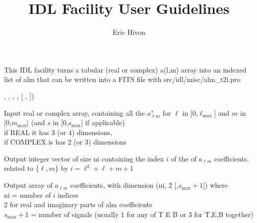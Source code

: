

\sloppy

\title{\healpix IDL Facility User Guidelines}
 \section[alm\_t2i]{ }
\label{idl:alm_t2i}
\author{Eric Hivon}

\begin{facility}
{This IDL facility turns a tabular (real or complex) a(l,m) array into an
indexed list of alm that can be written into a FITS file with %
}
{src/idl/misc/alm\_t2i.pro}
\end{facility}

\begin{IDLformat}
{\thedocid, %
,
, 
,
[%
,
%
])}
\end{IDLformat}

\begin{qualifiers}
  \begin{qulist}{} %
    \item[Alm\_table] 
Input real or complex array, containing all the $a^s_{\ell m}$ for $\ell$
         in [0,$\ell_\textrm{max}$] and $m$ in [0,$m_\textrm{max}$] 
(and $s$ in [0,$s_\textrm{max}$] if applicable)\\
       if REAL    it has 3 (or 4) dimensions,\\
       if COMPLEX is has 2 (or 3) dimensions

    \item[Index] 
Output integer vector of size ni containing the index $i$ of the 
            of $a_{\ell m}$ coefficients, related to $\{\ell,m\}$ by 
             $i = \ell^2 + \ell + m + 1$
    \item[Alm\_vec] %
Output array of $a_{\ell m}$ coefficients, with dimension (ni, 2 [,$s_\textrm{max}+1$])
     where\\
           ni   = number of $i$ indices\\
           2 for real and imaginary parts of alm coefficients\\
           $s_\textrm{max}+1$ = number of signals (usually 1 for any of T E B
                  or 3 for T,E,B together)
\end{qulist}
\end{qualifiers}

